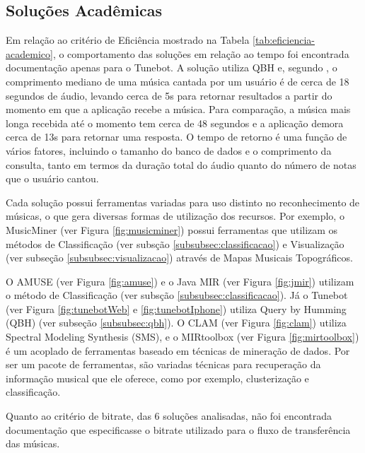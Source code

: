 \subsection{Soluções Acadêmicas}

Em relação ao critério de Eficiência mostrado na Tabela \ref{tab:eficiencia-academico}, o comportamento das soluções em relação ao tempo foi encontrada documentação apenas para o Tunebot. A solução utiliza QBH e, segundo , o comprimento mediano de uma música cantada por um usuário é de cerca de 18 segundos de áudio, levando cerca de 5s para retornar resultados a partir do momento em que a aplicação recebe a música. Para comparação, a música mais longa recebida até o momento tem cerca de 48 segundos e a aplicação demora cerca de 13s para retornar uma resposta. O tempo de retorno é uma função de vários fatores, incluindo o tamanho do banco de dados e o comprimento da consulta, tanto em termos da duração total do áudio quanto do número de notas que o usuário cantou.

Cada solução possui ferramentas variadas para uso distinto no reconhecimento de músicas, o que gera diversas formas de utilização dos recursos. Por exemplo, o MusicMiner (ver Figura \ref{fig:musicminer}) possui ferramentas que utilizam os métodos de Classificação (ver subsção \ref{subsubsec:classificacao}) e Visualização (ver subseção \ref{subsubsec:visualizacao}) através de Mapas Musicais Topográficos.

O AMUSE (ver Figura \ref{fig:amuse}) e o Java MIR (ver Figura \ref{fig:jmir}) utilizam o método de Classificação (ver subsção \ref{subsubsec:classificacao}). Já o Tunebot (ver Figura \ref{fig:tunebotWeb} e \ref{fig:tunebotIphone}) utiliza Query by Humming (QBH) (ver subseção \ref{subsubsec:qbh}). O CLAM (ver Figura \ref{fig:clam}) utiliza Spectral Modeling Synthesis (SMS), e o MIRtoolbox (ver Figura \ref{fig:mirtoolbox}) é um acoplado de ferramentas baseado em técnicas de mineração de dados. Por ser um pacote de ferramentas, são variadas técnicas para recuperação da informação musical que ele oferece, como por exemplo, clusterização e classificação.

Quanto ao critério de bitrate, das 6 soluções analisadas, não foi encontrada documentação que especificasse o bitrate utilizado para o fluxo de transferência das músicas.

